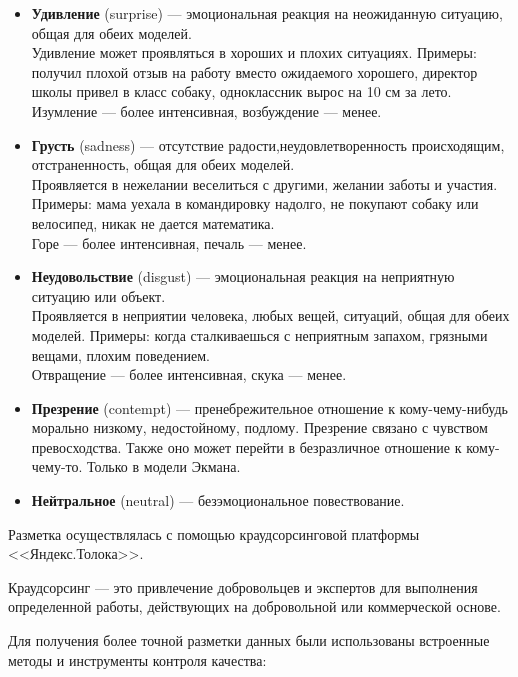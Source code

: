 \begin{itemize}
\item \textbf{Удивление} (surprise) --- эмоциональная реакция на неожиданную ситуацию, общая для обеих моделей.\\
Удивление может проявляться в хороших и плохих ситуациях.
Примеры: получил плохой отзыв на работу вместо ожидаемого хорошего, директор школы привел в класс собаку, одноклассник вырос на 10 см за лето.\\
Изумление --- более интенсивная, возбуждение --- менее.


\item \textbf{Грусть} (sadness) --- отсутствие радости,​ неудовлетворенность происходящим, отстраненность, общая для обеих моделей.\\
Проявляется в нежелании веселиться с другими, желании заботы и участия.
Примеры: мама уехала в командировку надолго, не покупают собаку или велосипед, никак не дается математика.\\
Горе --- более интенсивная, печаль --- менее.

\item \textbf{Неудовольствие} (disgust) --- эмоциональная реакция на неприятную ситуацию или объект.\\
Проявляется в неприятии человека, любых вещей, ситуаций, общая для обеих моделей.
Примеры: когда сталкиваешься с неприятным запахом, грязными вещами, плохим поведением.\\
Отвращение --- более интенсивная, скука --- менее.

\item \textbf{Презрение} (contempt) --- пренебрежительное отношение к кому-чему-нибудь морально низкому, недостойному, подлому. Презрение связано с чувством превосходства. Также оно может перейти в безразличное отношение к кому-чему-то. Только в модели Экмана.

\item \textbf{Нейтральное} (neutral) --- безэмоциональное повествование.

\end{itemize}

\bigskip
Разметка осуществлялась с помощью краудсорсинговой платформы <<Яндекс.Толока>>.

\begin{definition}
 Краудсорсинг --- это привлечение добровольцев и экспертов для выполнения определенной работы, действующих на добровольной или коммерческой основе.
\end{definition}

Для получения более точной разметки данных были использованы встроенные методы и инструменты контроля качества:

